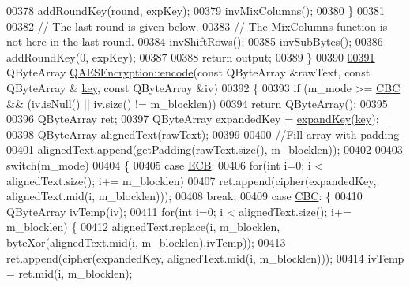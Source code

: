 \begin{DoxyCode}
00378         addRoundKey(round, expKey);
00379         invMixColumns();
00380     \}
00381 
00382     \textcolor{comment}{// The last round is given below.}
00383     \textcolor{comment}{// The MixColumns function is not here in the last round.}
00384     invShiftRows();
00385     invSubBytes();
00386     addRoundKey(0, expKey);
00387 
00388     \textcolor{keywordflow}{return} output;
00389 \}
00390 
\mbox{\hyperlink{class_q_a_e_s_encryption_a0c56eddd6f03e93b1f7faad464044d65}{00391}} QByteArray \mbox{\hyperlink{class_q_a_e_s_encryption_a0c56eddd6f03e93b1f7faad464044d65}{QAESEncryption::encode}}(\textcolor{keyword}{const} QByteArray &rawText, \textcolor{keyword}{const} QByteArray &
      \mbox{\hyperlink{namespace_errors_dict_setup_a09c268098d09ffb8e5504f30fa6d5dd9}{key}}, \textcolor{keyword}{const} QByteArray &iv)
00392 \{
00393     \textcolor{keywordflow}{if} (m\_mode >= \mbox{\hyperlink{class_q_a_e_s_encryption_ad3e031c49a3d56566379d75b40b7b255a559bffc55d3599d0a172cc85aed98966}{CBC}} && (iv.isNull() || iv.size() != m\_blocklen))
00394        \textcolor{keywordflow}{return} QByteArray();
00395 
00396     QByteArray ret;
00397     QByteArray expandedKey = \mbox{\hyperlink{class_q_a_e_s_encryption_a5bfbb972f84a8376fceed648553c0912}{expandKey}}(\mbox{\hyperlink{namespace_errors_dict_setup_a09c268098d09ffb8e5504f30fa6d5dd9}{key}});
00398     QByteArray alignedText(rawText);
00399 
00400     \textcolor{comment}{//Fill array with padding}
00401     alignedText.append(getPadding(rawText.size(), m\_blocklen));
00402 
00403     \textcolor{keywordflow}{switch}(m\_mode)
00404     \{
00405     \textcolor{keywordflow}{case} \mbox{\hyperlink{class_q_a_e_s_encryption_ad3e031c49a3d56566379d75b40b7b255a4ca7f51778e2adf1f464164a0ba8e75e}{ECB}}:
00406         \textcolor{keywordflow}{for}(\textcolor{keywordtype}{int} i=0; i < alignedText.size(); i+= m\_blocklen)
00407             ret.append(cipher(expandedKey, alignedText.mid(i, m\_blocklen)));
00408         \textcolor{keywordflow}{break};
00409     \textcolor{keywordflow}{case} \mbox{\hyperlink{class_q_a_e_s_encryption_ad3e031c49a3d56566379d75b40b7b255a559bffc55d3599d0a172cc85aed98966}{CBC}}: \{
00410             QByteArray ivTemp(iv);
00411             \textcolor{keywordflow}{for}(\textcolor{keywordtype}{int} i=0; i < alignedText.size(); i+= m\_blocklen) \{
00412                 alignedText.replace(i, m\_blocklen, byteXor(alignedText.mid(i, m\_blocklen),ivTemp));
00413                 ret.append(cipher(expandedKey, alignedText.mid(i, m\_blocklen)));
00414                 ivTemp = ret.mid(i, m\_blocklen);

\end{DoxyCode}
